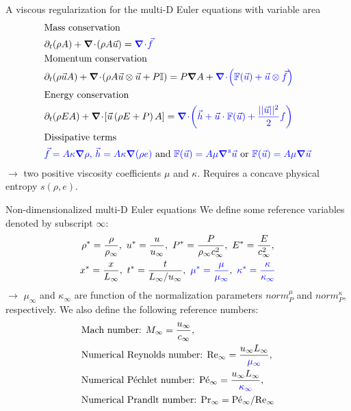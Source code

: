 \documentclass[xcolor=dvipsnames,10pt]{beamer}
\renewcommand{\Re}{\textrm{Re}}
\newcommand{\Pe}{\textrm{P\'e}}
\renewcommand{\Pr}{\textrm{Pr}}
\renewcommand{\div}{\boldsymbol{\nabla}\! \cdot \!}
\newcommand{\grad}{\boldsymbol{\nabla}}
\begin{document}
\begin{frame}{A viscous regularization for the multi-D Euler equations with variable area}
\begin{align}
&\text{Mass conservation} \nonumber \\
&\partial_t ( \rho A ) + \div \left( \rho A \vec{u} \right) = \textcolor{blue}{\div \vec{f}} \nonumber \\
&\text{Momentum conservation} \nonumber \\
&\partial_t ( \rho \vec{u} A ) + \div \left( \rho A \vec{u} \otimes \vec{u} + P \mathbb{I} \right) = P \grad A + \textcolor{blue}{\div \left( \mathbb{F}(\vec{u}) + \vec{u} \otimes \vec{f} \right)} \nonumber \\
&\text{Energy conservation} \nonumber \\
&\partial_t ( \rho E A ) + \div \left[ \vec{u} \left( \rho E + P \right) A \right] = \textcolor{blue}{\div \left( \vec{h} + \vec{u}\cdot \mathbb{F}(\vec{u}) + \frac{|| \vec{u} ||^2}{2} f \right)} \nonumber \\
&\text{Dissipative terms} \nonumber \\
& \textcolor{blue}{\vec{f} = A \kappa \grad \rho \text{, } \vec{h} = A \kappa \grad ( \rho e) } \nonumber
\text{ and } \textcolor{blue}{\mathbb{F}(\vec{u}) = A \mu \grad^s \vec{u}} \text{ or } \textcolor{blue}{\mathbb{F}(\vec{u}) = A \mu \grad \vec{u}}
\end{align}
$\to$ two positive viscosity coefficients $\mu$ and $\kappa$. Requires a concave physical entropy $s(\rho,e)$.
\end{frame}
\begin{frame}{Non-dimensionalized multi-D Euler equations}
We define some reference variables denoted by subscript $\infty$:
\begin{multline}
\label{eq:norm_param}
\rho^*   = \frac{\rho}{\rho_\infty}           ,\
u^*      = \frac{u}{u_\infty}                 ,\
P^*      = \frac{P}{\rho_\infty c^2_\infty}   ,\
E^*      = \frac{E}{c^2_\infty }              ,\\
x^* = \frac{x}{L_\infty}                      ,\
t^* = \frac{t}{L_\infty / u_\infty}           ,\ 
\textcolor{blue}{\mu^*    = \frac{\mu}{\mu_\infty}}             ,\
\textcolor{blue}{\kappa^* = \frac{\kappa}{\kappa_\infty}}     \nonumber
\end{multline}
$\to$ $\mu_\infty$ and $\kappa_\infty$ are function of the normalization parameters $norm_P^\mu$ and $norm_P^\kappa$, respectively.
We also define the following reference numbers:
\begin{align}
&\text{Mach number: }M_\infty = \frac{u_\infty}{c_\infty}, \nonumber\\
&\text{Numerical Reynolds number: }\Re_\infty = \frac{u_\infty L_\infty}{\textcolor{blue}{\mu_\infty}} , \nonumber \\
&\text{Numerical P\'echlet number: }\Pe_\infty = \frac{u_\infty L_\infty}{\textcolor{blue}{\kappa_\infty}} , \nonumber \\
&\text{Numerical Prandlt number: }\Pr_\infty = \Pe_\infty / \Re_\infty \nonumber \nonumber
\end{align}
\end{frame}
\end{document}
